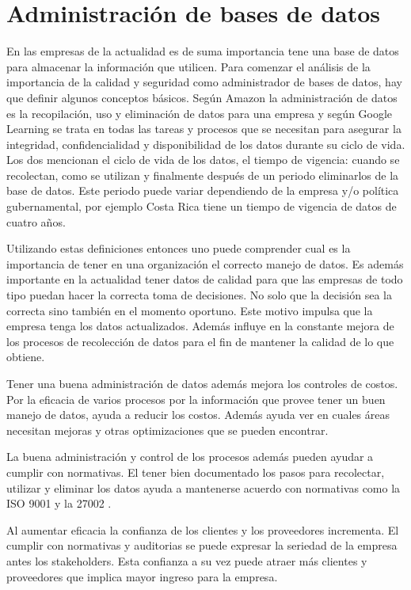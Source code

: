 \documentclass[12pt, article, natbib]{IEEEtran}
\begin{document}
\section{Administración de bases de datos}
En las empresas de la actualidad es de suma importancia tene una base de datos para almacenar la información que utilicen. Para comenzar el análisis de la importancia de la calidad y seguridad como administrador de bases de datos, hay que definir algunos conceptos básicos. Según Amazon \cite{amazonbasesdedatos} la administración de datos es la recopilación, uso y eliminación de datos para una empresa y según Google Learning \cite{googleadmindatos} se trata en todas las tareas y procesos que se necesitan para asegurar la integridad, confidencialidad y disponibilidad de los datos durante su ciclo de vida. Los dos mencionan el ciclo de vida de los datos, el tiempo de vigencia: cuando se recolectan, como se utilizan y finalmente después de un periodo eliminarlos de la base de datos. Este periodo puede variar dependiendo de la empresa y/o política gubernamental, por ejemplo Costa Rica tiene un tiempo de vigencia de datos de cuatro años.

Utilizando estas definiciones entonces uno puede comprender cual es la importancia de tener en una organización el correcto manejo de datos. Es además importante en la actualidad tener datos de calidad para que las empresas de todo tipo puedan hacer la correcta toma de decisiones. No solo que la decisión sea la correcta sino también en el momento oportuno. Este motivo impulsa que la empresa tenga los datos actualizados. Además influye en la constante mejora de los procesos de recolección de datos para el fin de mantener la calidad de lo que obtiene. 

Tener una buena administración de datos además mejora los controles de costos. Por la eficacia de varios procesos por la información que provee tener un buen manejo de datos, ayuda a reducir los costos. Además ayuda ver en cuales áreas necesitan mejoras y otras optimizaciones que se pueden encontrar.

La buena administración y control de los procesos además pueden ayudar a cumplir con normativas. El tener bien documentado los pasos para recolectar, utilizar y eliminar los datos ayuda a mantenerse acuerdo con normativas como la ISO 9001 \cite{ISO9001} y la 27002 \cite{ISO27002}.

Al aumentar eficacia la confianza de los clientes y los proveedores incrementa. El cumplir con normativas y auditorias se puede expresar la seriedad de la empresa antes los stakeholders. Esta confianza a su vez puede atraer más clientes y proveedores que implica mayor ingreso para la empresa.
\end{document}
